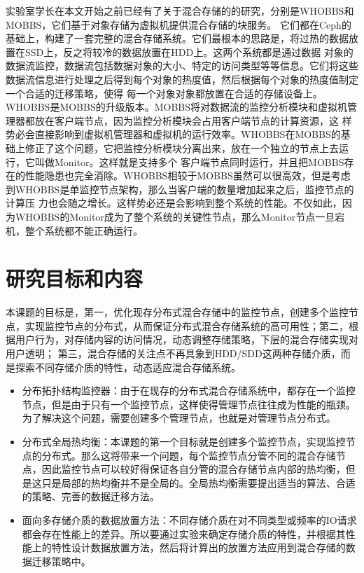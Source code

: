 实验室学长在本文开始之前已经有了关于混合存储的的研究，分别是WHOBBS\cite{lingxuan2015whobbs}和MOBBS\cite{ma2014mobbs}，它们基于对象存储为虚拟机提供混合存储的块服务。
它们都在Ceph\cite{weil2006ceph}的基础上，构建了一套完整的混合存储系统。它们最根本的思路是，将过热的数据放置在SSD上，反之将较冷的数据放置在HDD上。这两个系统都是通过数据
对象的数据流监控，数据流包括数据对象的大小、特定的访问类型等等信息。它们将这些数据流信息进行处理之后得到每个对象的热度值，然后根据每个对象的热度值制定一个合适的迁移策略，使得
每一个对象对象都放置在合适的存储设备上。WHOBBS是MOBBS的升级版本。MOBBS将对数据流的监控分析模块和虚拟机管理器都放在客户端节点，因为监控分析模块会占用客户端节点的计算资源，这
样势必会直接影响到虚拟机管理器和虚拟机的运行效率。WHOBBS在MOBBS的基础上修正了这个问题，它把监控分析模块分离出来，放在一个独立的节点上去运行，它叫做Monitor。这样就是支持多个
客户端节点同时运行，并且把MOBBS存在的性能隐患也完全消除。WHOBBS相较于MOBBS虽然可以很高效，但是考虑到WHOBBS是单监控节点架构，那么当客户端的数量增加起来之后，监控节点的计算压
力也会随之增长。这样势必还是会影响到整个系统的性能。不仅如此，因为WHOBBS的Monitor成为了整个系统的关键性节点，那么Monitor节点一旦宕机，整个系统都不能正确运行。

\section{研究目标和内容}
本课题的目标是，第一，优化现存分布式混合存储中的监控节点，创建多个监控节点，实现监控节点的分布式，从而保证分布式混合存储系统的高可用性；第二，根据用户行为，对存储内容的访问情况，动态调整存储策略，下层的混合存储实现对用户透明；
第三，混合存储的关注点不再具象到HDD/SDD这两种存储介质，而是探索不同存储介质的特性，动态适应混合存储系统。

\begin{itemize}[noitemsep,topsep=0pt,parsep=10pt,partopsep=10pt]
	\item 分布拓扑结构监控器：由于在现存的分布式混合存储系统中，都存在一个监控节点，但是由于只有一个监控节点，这样使得管理节点往往成为性能的瓶颈。为了解决这个问题，需要创建多个管理节点，也就是对管理节点分布式。
	\item 分布式全局热均衡：本课题的第一个目标就是创建多个监控节点，实现监控节点的分布式。那么这将带来一个问题，每个监控节点分管不同的混合存储节点，因此监控节点可以较好得保证各自分管的混合存储节点内部的热均衡，但是这只是局部的热均衡并不是全局的。全局热均衡需要提出适当的算法、合适的策略、完善的数据迁移方法。	
	\item 面向多存储介质的数据放置方法：不同存储介质在对不同类型或频率的IO请求都会存在性能上的差异。所以要通过实验来确定存储介质的特性，并根据其性能上的特性设计数据放置方法，然后将计算出的放置方法应用到混合存储的数据迁移策略中。
\end{itemize}

